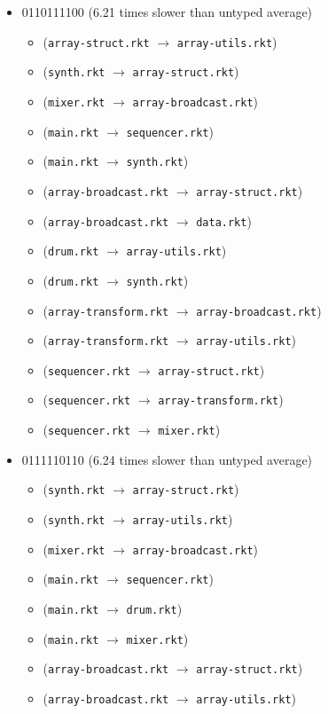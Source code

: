 \documentclass{article}
\newcommand{\mono}[1]{\texttt{#1}}
\begin{document}
\begin{itemize}
\item 0110111100 (6.21 times slower than untyped average)
  \begin{itemize}
  \item (\mono{array-struct.rkt} $\rightarrow$ \mono{array-utils.rkt})
  \item (\mono{synth.rkt} $\rightarrow$ \mono{array-struct.rkt})
  \item (\mono{mixer.rkt} $\rightarrow$ \mono{array-broadcast.rkt})
  \item (\mono{main.rkt} $\rightarrow$ \mono{sequencer.rkt})
  \item (\mono{main.rkt} $\rightarrow$ \mono{synth.rkt})
  \item (\mono{array-broadcast.rkt} $\rightarrow$ \mono{array-struct.rkt})
  \item (\mono{array-broadcast.rkt} $\rightarrow$ \mono{data.rkt})
  \item (\mono{drum.rkt} $\rightarrow$ \mono{array-utils.rkt})
  \item (\mono{drum.rkt} $\rightarrow$ \mono{synth.rkt})
  \item (\mono{array-transform.rkt} $\rightarrow$ \mono{array-broadcast.rkt})
  \item (\mono{array-transform.rkt} $\rightarrow$ \mono{array-utils.rkt})
  \item (\mono{sequencer.rkt} $\rightarrow$ \mono{array-struct.rkt})
  \item (\mono{sequencer.rkt} $\rightarrow$ \mono{array-transform.rkt})
  \item (\mono{sequencer.rkt} $\rightarrow$ \mono{mixer.rkt})
  \end{itemize}
\item 0111110110 (6.24 times slower than untyped average)
  \begin{itemize}
  \item (\mono{synth.rkt} $\rightarrow$ \mono{array-struct.rkt})
  \item (\mono{synth.rkt} $\rightarrow$ \mono{array-utils.rkt})
  \item (\mono{mixer.rkt} $\rightarrow$ \mono{array-broadcast.rkt})
  \item (\mono{main.rkt} $\rightarrow$ \mono{sequencer.rkt})
  \item (\mono{main.rkt} $\rightarrow$ \mono{drum.rkt})
  \item (\mono{main.rkt} $\rightarrow$ \mono{mixer.rkt})
  \item (\mono{array-broadcast.rkt} $\rightarrow$ \mono{array-struct.rkt})
  \item (\mono{array-broadcast.rkt} $\rightarrow$ \mono{array-utils.rkt})

\end{itemize}
\end{itemize}
\end{document}
